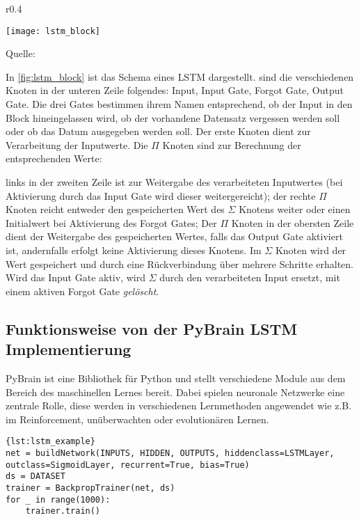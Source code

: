 \begin{wrapfigure}{r}{0.4\textwidth}
	\begin{center}
	\texttt{[image: lstm\_block]}
	\caption{Schema eines \acs{LSTM} Blocks}
	Quelle: \cite{WIKI2013}
	\label{fig:lstm_block}
	\end{center}
\end{wrapfigure}
In \autoref{fig:lstm_block} ist das Schema eines \ac{LSTM} dargestellt. sind die
verschiedenen Knoten in der unteren Zeile folgendes: Input, Input Gate, Forgot
Gate, Output Gate. Die drei Gates bestimmen ihrem Namen entsprechend, ob der
Input in den Block hineingelassen wird, ob der vorhandene Datensatz vergessen
werden soll oder ob das Datum ausgegeben werden soll. Der erste Knoten dient zur
Verarbeitung der Inputwerte. Die $\Pi$ Knoten sind zur Berechnung der
entsprechenden Werte:

links in der zweiten Zeile ist zur Weitergabe des verarbeiteten Inputwertes
(bei Aktivierung durch das Input Gate wird dieser weitergereicht); der rechte
$\Pi$ Knoten reicht entweder den gespeicherten Wert des $\Sigma$ Knotens weiter
oder einen Initialwert bei Aktivierung des Forgot Gates; Der $\Pi$ Knoten in der
obersten Zeile dient der Weitergabe des gespeicherten Wertes, falls das Output
Gate aktiviert ist, andernfalls erfolgt keine Aktivierung dieses Knotens. Im
$\Sigma$ Knoten wird der Wert gespeichert und durch eine Rückverbindung über
mehrere Schritte erhalten. Wird das Input Gate aktiv, wird $\Sigma$ durch den
verarbeiteten Input ersetzt, mit einem aktiven Forgot Gate \textit{gelöscht}. 



\subsection{Funktionsweise von der \acs{PyBrain} \acs{LSTM} Implementierung}
\ac{PyBrain}\cite{schaul2010} ist eine Bibliothek für Python und stellt
verschiedene Module aus dem Bereich des maschinellen Lernes bereit. Dabei
spielen neuronale Netzwerke eine zentrale Rolle, diese werden in verschiedenen
Lernmethoden angewendet wie z.B. im Reinforcement, unüberwachten oder
evolutionären Lernen.
\enlargethispage{\baselineskip}
\enlargethispage{\baselineskip}
\enlargethispage{\baselineskip}
\begin{lstlisting}[caption={Aufbau eines LSTM Netzes},label={lst:lstm_example}]{lst:lstm_example} 
net = buildNetwork(INPUTS, HIDDEN, OUTPUTS, hiddenclass=LSTMLayer,
outclass=SigmoidLayer, recurrent=True, bias=True) 
ds = DATASET 
trainer = BackpropTrainer(net, ds)
for _ in range(1000):
    trainer.train()
\end{lstlisting}

